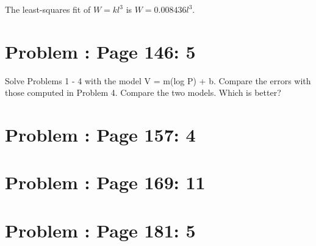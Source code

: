 \documentclass[]{article}
\begin{document}
The least-squares fit of \(W = kl^3\) is \(W = 0.008436l^3\).

\section{Problem : Page 146: 5}\label{problem-page-146-5}

Solve Problems 1 - 4 with the model V = m(log P) + b. Compare the errors
with those computed in Problem 4. Compare the two models. Which is
better?

\section{Problem : Page 157: 4}\label{problem-page-157-4}

\section{Problem : Page 169: 11}\label{problem-page-169-11}

\section{Problem : Page 181: 5}\label{problem-page-181-5}
\end{document}
